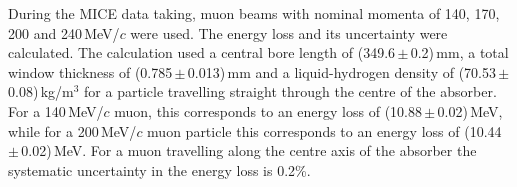 During the MICE data taking, muon beams with nominal momenta of 140,
170, 200 and 240\,MeV/$c$ were used.
The energy loss and its uncertainty were calculated.
The calculation used a central bore length of
(349.6\,$\mathrm{\pm}$\,0.2)\,mm, a total window thickness of
(0.785\,$\mathrm{\pm}$\,0.013)\,mm and a liquid-hydrogen density of
(70.53\,$\mathrm{\pm}$\,0.08)\,kg/m$^{3}$ for a particle travelling
straight through the centre of the absorber. 
For a 140\,MeV/$c$ muon, this corresponds to an energy loss of
(10.88\,$\mathrm{\pm}$\,0.02)\,MeV, while for a 200\,MeV/$c$ muon 
particle this corresponds to an energy loss of
(10.44\,$\mathrm{\pm}$\,0.02)\,MeV.
For a muon travelling along the centre axis of the absorber the
systematic uncertainty in the energy loss is 0.2\%.
